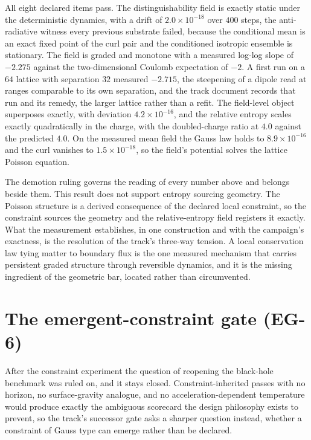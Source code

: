 \documentclass[aps,pre,reprint,nofootinbib]{revtex4-2}
\begin{document}
All eight declared items pass.  The distinguishability field is
exactly static under the deterministic dynamics, with a drift of
$2.0\times10^{-18}$ over $400$ steps, the anti-radiative witness
every previous substrate failed, because the conditional mean is an
exact fixed point of the curl pair and the conditioned isotropic
ensemble is stationary.  The field is graded and monotone with a
measured log-log slope of $-2.275$ against the two-dimensional
Coulomb expectation of $-2$.  A first run on a $64$ lattice with
separation $32$ measured $-2.715$, the steepening of a dipole read
at ranges comparable to its own separation, and the track document
records that run and its remedy, the larger lattice rather than a
refit.  The field-level object
superposes exactly, with deviation $4.2\times10^{-16}$, and the
relative entropy scales exactly quadratically in the charge, with
the doubled-charge ratio at $4.0$ against the predicted $4.0$.  On
the measured mean field the Gauss law holds to $8.9\times10^{-16}$
and the curl vanishes to $1.5\times10^{-18}$, so the field's
potential solves the lattice Poisson equation.

The demotion ruling governs the reading of every number above and
belongs beside them.  This result does not support entropy sourcing
geometry.  The Poisson structure is a derived consequence of the
declared local constraint, so the constraint sources the geometry
and the relative-entropy field registers it exactly.  What the
measurement establishes, in one construction and with the
campaign's exactness, is the resolution of the track's three-way
tension.  A local conservation law tying matter to boundary flux is
the one measured mechanism that carries persistent graded structure
through reversible dynamics, and it is the missing ingredient of
the geometric bar, located rather than circumvented.

\section{The emergent-constraint gate (EG-6)}
\label{sec:eg6}

After the constraint experiment the question of reopening the
black-hole benchmark was ruled on, and it stays closed.
Constraint-inherited passes with no horizon, no surface-gravity
analogue, and no acceleration-dependent temperature would produce
exactly the ambiguous scorecard the design philosophy exists to
prevent, so the track's successor gate asks a sharper question
instead, whether a constraint of Gauss type can emerge rather than
be declared.
\end{document}
